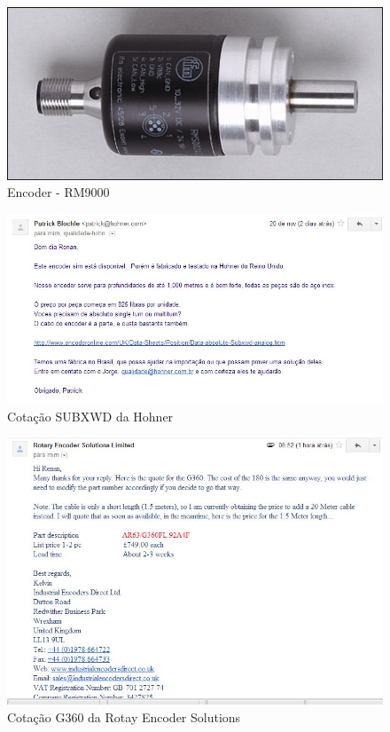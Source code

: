 \begin{figure}[h!]
 \centering
 \includegraphics[width=1\columnwidth]{Encoder/foto}
 \caption{Encoder - RM9000 }
  
\end{figure}
\newpage


\begin{figure}[h!]
 \centering
 \includegraphics[width=1\columnwidth]{Encoder/price_quote_1}
 \caption{Cotação SUBXWD da Hohner}
\end{figure}

\begin{figure}[h!]
 \centering
 \includegraphics[width=1\columnwidth]{Encoder/price_quote_2}
 \caption{Cotação G360 da Rotay Encoder Solutions } 
\end{figure}

